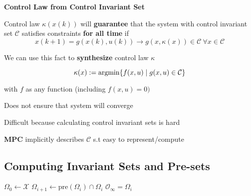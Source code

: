 \begin{sstTitleBox}[BrickRed]{\center\textbf{\large
			Control Law from Control Invariant Set
		}}

	\begin{sstOnlyFrame}[BrickRed]

		\begin{centering}
			Control law $\kappa(x(k))$ will \textbf{guarantee}
			that the system
			with control invariant set $\mathcal{C}$
			satisfies constraints \textbf{for all time} if
			$$x(k+1)=g(x(k),u(k))\to
				g(x,\kappa(x)) \in \mathcal{C} \ \forall x \in \mathcal{C}$$

			We can use this fact to \textbf{synthesize}
			control law $\kappa$

		\end{centering}
		\begin{sstFullFrame}[BrickRed]\color{white}
			\[
				\kappa(x):=\operatorname{argmin}\{f(x,u) \mid g(x,u)\in\mathcal{C}\}
			\]
		\end{sstFullFrame}

		with $f$ as any function (including $f(x,u)=0)$
	\end{sstOnlyFrame}

	\begin{sstOnlyFrame}[BrickRed]
		Does not ensure that system will converge

		Difficult because calculating control invariant sets is hard

		\textbf{MPC} implicitly describes $\mathcal{C}$
		s.t easy to represent/compute
	\end{sstOnlyFrame}
\end{sstTitleBox}


\subsection{Computing Invariant Sets and Pre-sets}


\begin{minipage}{0.53\linewidth}
	\begin{sstFullFrame}[ForestGreen]
		\color{white}
		\begin{algorithmic}
			\State $\Omega_0 \leftarrow \mathcal{X}$
			\Loop
			\State $\Omega_{i+1} \leftarrow \mathrm{pre}(\Omega_i)\cap\Omega_i$
			\State\Return $\mathcal{O}_\infty = \Omega_i$
			\EndIf
			\EndLoop
		\end{algorithmic}
	\end{sstFullFrame}
\end{minipage}

